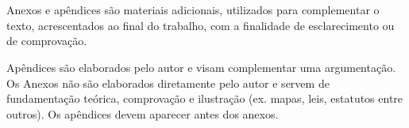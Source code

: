 \section*{}

Anexos e apêndices são materiais adicionais, utilizados para complementar o texto, acrescentados ao final do trabalho, com a finalidade de esclarecimento ou de comprovação.

Apêndices são elaborados pelo autor e visam complementar uma argumentação. Os Anexos não são elaborados diretamente pelo autor e servem de fundamentação teórica, comprovação e ilustração (ex. mapas, leis, estatutos entre outros). Os apêndices devem aparecer antes dos anexos.